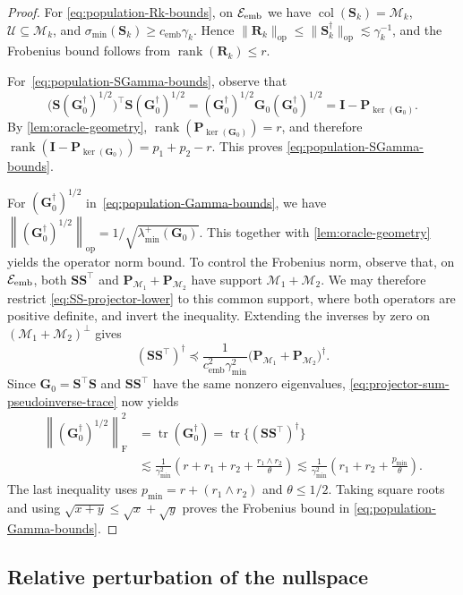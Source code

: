 \documentclass[11pt]{article}
\newcommand{\trans}{\top}
\DeclareMathOperator{\col}{col}
\DeclareMathOperator{\rank}{rank}
\DeclareMathOperator{\tr}{tr}
\newcommand{\opn}[1]{\left\lVert #1\right\rVert_{\mathrm{op}}}
\newcommand{\frn}[1]{\left\lVert #1\right\rVert_{\mathrm{F}}}
\newcommand{\cU}{\mathcal{U}}
\newcommand{\cM}{\mathcal{M}}
\newcommand{\cE}{\mathcal{E}}
\newcommand{\gmin}{\gamma_{\min}}
\newcommand{\cemb}{c_{\mathrm{emb}}}
\begin{document}
\begin{proof}
For \cref{eq:population-Rk-bounds}, on $\cE_{\rm emb}$ we have
$\col(\bm S_k)=\cM_k$, $\cU\subseteq\cM_k$, and
$\sigma_{\min}(\bm S_k)\ge\cemb\gamma_k$.  Hence
$\|\bm R_k\|_{\mathrm{op}}
\le\|\bm S_k^\dagger\|_{\mathrm{op}}
\lesssim\gamma_k^{-1}$, and the Frobenius bound follows from
$\rank(\bm R_k)\le r$.

For~\cref{eq:population-SGamma-bounds}, observe that
\[
  \bigl(\bm S(\bm G_0^\dagger)^{1/2}\bigr)^\trans\bm S(\bm G_0^\dagger)^{1/2}
  =
  (\bm G_0^\dagger)^{1/2}\bm G_0(\bm G_0^\dagger)^{1/2}
  =
  \bm I-\bm P_{\ker(\bm G_0)}.
\]
By \cref{lem:oracle-geometry}, $\rank(\bm P_{\ker(\bm G_0)})=r$, and therefore
$\rank(\bm I-\bm P_{\ker(\bm G_0)})=p_1+p_2-r$.  This proves
\cref{eq:population-SGamma-bounds}. 


For $(\bm G_0^\dagger)^{1/2}$ in~\cref{eq:population-Gamma-bounds}, we have $\opn{(\bm G_0^\dagger)^{1/2}} = 1/ \sqrt{\lambda_{\min}^+(\bm G_0)}$. 
This together with \cref{lem:oracle-geometry} yields the operator norm bound. 
To control the Frobenius norm, observe that, on $\cE_{\rm emb}$, both
$\bm S\bm S^\trans$ and
$\bm P_{\cM_1}+\bm P_{\cM_2}$ have support
$\cM_1+\cM_2$. We may therefore restrict
\cref{eq:SS-projector-lower} to this common support, where both operators are
positive definite, and invert the inequality. Extending the inverses by zero
on $(\cM_1+\cM_2)^\perp$ gives
\[
  (\bm S\bm S^\trans)^\dagger
  \preceq
  \frac{1}{\cemb^2\gmin^2}
  \bigl(\bm P_{\cM_1}+\bm P_{\cM_2}\bigr)^\dagger.
\]
Since $\bm G_0=\bm S^\trans\bm S$ and
$\bm S\bm S^\trans$ have the same nonzero eigenvalues,
\cref{eq:projector-sum-pseudoinverse-trace} now yields
\[
\begin{aligned}
  \frn{(\bm G_0^\dagger)^{1/2}}^2
  &=
  \tr(\bm G_0^\dagger)
  =
  \tr\{(\bm S\bm S^\trans)^\dagger\} \\
  &\lesssim
  \frac{1}{\gmin^2}
  \left(
    r+r_1+r_2+\frac{r_1\wedge r_2}{\theta}
  \right)
  \lesssim
  \frac{1}{\gmin^2}
  \left(
    r_1+r_2+\frac{p_{\min}}{\theta}
  \right).
\end{aligned}
\]
The last inequality uses
$p_{\min}=r+(r_1\wedge r_2)$ and $\theta\le1/2$. Taking square roots and using
$\sqrt{x+y}\le\sqrt x+\sqrt y$ proves the Frobenius bound in
\cref{eq:population-Gamma-bounds}.
\end{proof}

\subsection{Relative perturbation of the nullspace}
\label{app:nullspace-perturbation}
\end{document}
